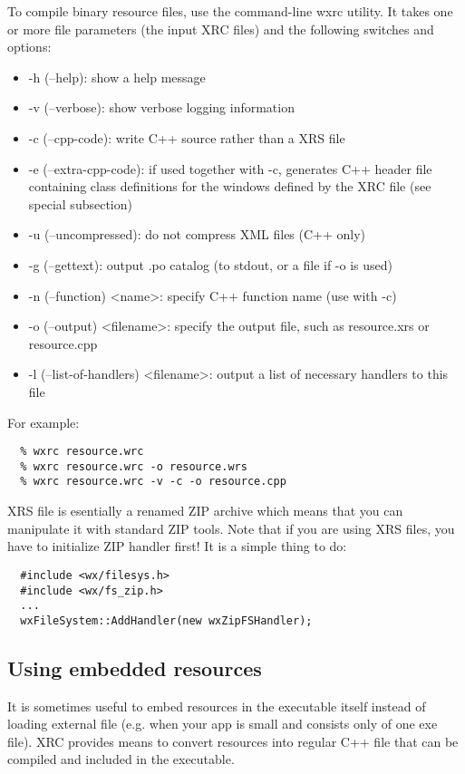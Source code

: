 To compile binary resource files, use the command-line wxrc utility. It takes one or more file parameters
(the input XRC files) and the following switches and options:
\begin{itemize}\itemsep=0pt
\item -h (--help): show a help message
\item -v (--verbose): show verbose logging information
\item -c (--cpp-code): write C++ source rather than a XRS file
\item -e (--extra-cpp-code): if used together with -c, generates C++ header file
containing class definitions for the windows defined by the XRC file (see special subsection) 
\item -u (--uncompressed): do not compress XML files (C++ only)
\item -g (--gettext): output .po catalog (to stdout, or a file if -o is used)
\item -n (--function) <name>: specify C++ function name (use with -c)
\item -o (--output) <filename>: specify the output file, such as resource.xrs or resource.cpp
\item -l (--list-of-handlers) <filename>: output a list of necessary handlers to this file
\end{itemize}

For example:
\begin{verbatim}
  % wxrc resource.wrc
  % wxrc resource.wrc -o resource.wrs
  % wxrc resource.wrc -v -c -o resource.cpp
\end{verbatim}


XRS file is esentially a renamed ZIP archive which means that you can manipulate
it with standard ZIP tools. Note that if you are using XRS files, you have
to initialize  ZIP handler first! It is a simple
thing to do:

\begin{verbatim}
  #include <wx/filesys.h>
  #include <wx/fs_zip.h>
  ...
  wxFileSystem::AddHandler(new wxZipFSHandler);
\end{verbatim}

\subsection{Using embedded resources}\label{embeddedresource}

It is sometimes useful to embed resources in the executable itself instead
of loading external file (e.g. when your app is small and consists only of one
exe file). XRC provides means to convert resources into regular C++ file that
can be compiled and included in the executable. 

